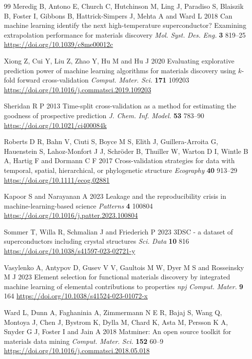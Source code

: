 \documentclass{iopjournal}
\begin{document}
{\begin{thebibliography}{99}
Meredig B, Antono E, Church C, Hutchinson M, Ling J, Paradiso S, Blaiszik B, Foster I, Gibbons B, Hattrick-Simpers J, Mehta A and Ward L 2018 Can machine learning identify the next high-temperature superconductor? Examining extrapolation performance for materials discovery
\textit{Mol. Syst. Des. Eng.} \textbf{3} 819--25
\url{https://doi.org/10.1039/c8me00012c}

Xiong Z, Cui Y, Liu Z, Zhao Y, Hu M and Hu J 2020 Evaluating explorative prediction power of machine learning algorithms for materials discovery using $k$-fold forward cross-validation
\textit{Comput. Mater. Sci.} \textbf{171} 109203
\url{https://doi.org/10.1016/j.commatsci.2019.109203}

Sheridan R P 2013 Time-split cross-validation as a method for estimating the goodness of prospective prediction
\textit{J. Chem. Inf. Model.} \textbf{53} 783--90
\url{https://doi.org/10.1021/ci400084k}

Roberts D R, Bahn V, Ciuti S, Boyce M S, Elith J, Guillera-Arroita G, Hauenstein S, Lahoz-Monfort J J, Schröder B, Thuiller W, Warton D I, Wintle B A, Hartig F and Dormann C F 2017 Cross-validation strategies for data with temporal, spatial, hierarchical, or phylogenetic structure
\textit{Ecography} \textbf{40} 913--29
\url{https://doi.org/10.1111/ecog.02881}

Kapoor S and Narayanan A 2023 Leakage and the reproducibility crisis in machine-learning-based
science \textit{Patterns} \textbf{4} 100804
\url{https://doi.org/10.1016/j.patter.2023.100804}

Sommer T, Willa R, Schmalian J and Friederich P 2023 3DSC - a dataset of superconductors including crystal structures
\textit{Sci. Data} \textbf{10} 816
\url{https://doi.org/10.1038/s41597-023-02721-y}

Vasylenko A, Antypov D, Gusev V V, Gaultois M W, Dyer M S and Rosseinsky M J 2023 Element selection for functional materials discovery by integrated machine learning of elemental contributions to properties
\textit{npj Comput. Mater.} \textbf{9} 164
\url{https://doi.org/10.1038/s41524-023-01072-x}

Ward L, Dunn A, Faghaninia A, Zimmermann N E R, Bajaj S, Wang Q, Montoya J, Chen J, Bystrom K,
Dylla M, Chard K, Asta M, Persson K A, Snyder G J, Foster I and Jain A 2018
Matminer: An open source toolkit for materials data mining
\textit{Comput. Mater. Sci.} \textbf{152} 60--9
\url{https://doi.org/10.1016/j.commatsci.2018.05.018}


\end{thebibliography}}
\end{document}
